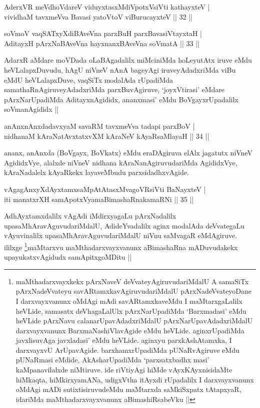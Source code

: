 \begin{shl}
AderxVR meVdhoVdareV viduyxtasxMdiVpotxV\s siVti kathayxteV | \\
vividhaM tavxmeVva Bavasi yatoV\s toV viBurucayxteV \hfill|| 32 || 
\end{shl}

\begin{shl}
soVmoV vaqSATxyXdiBAveVna parxBuH parxBavasiVtayxtaH | \\
AditayxH pArxNaBAveVna hayxnanxBAveVna soVmatA \hfill|| 33 || 
\end{shl}

\begin{artha}
AdarxR aMdare moVDada oLaBAgadalilx miMciniMda hoLeyutAtx iruve eMdu heVLalapxDuvudu, hAgU niVneV nAnA bageyAgi iruveyAdadxriMda viBu eMdU heVLalapxDuve, vaqSiTx modalAda rUpadiMda samathaRnAgiruveyAdadxriMda parxBuvAgiruve, `joyxVtirasi' eMdare pArxNarUpadiMda AditayxnAgididx, ananxmasi' eMdu BoVgayxrUpadalilx soVmanAgididx ||
\end{artha}

\begin{shl}
anAnxnAnxdadavxyaM savaRM tavxmeVva tadapi parxBoV | \\
nidhanaM kAraNatAvxtatxvXM kAraNeV kAyaRsaMlayaH \hfill|| 34 || 
\end{shl}

\begin{artha}
ananx, anAnxda (BoVgayx, BoVkatx) eMdu eraDAgiruva elAlx jagatutx niVneV AgididxVye, alalxde niVneV nidhana kAraNanAgiruvudariMda AgididxVye, kAraNadalelx kAyaRkekx layaveMbudu parxsidadhxvAgide.
\end{artha}

\begin{shl}
vAgagAnxyXdAyxtamxsaMpAtAtasxMvagoVR\s siVti BaNayxteV | \\
iti manatxrXH samApotxV\s yamaBimashaRnakamaRNi \hfill|| 35 || 
\end{shl}

\begin{artha}
  AdhAyxtamxdalilx vAgAdi iMdirxyagaLu pArxNadalilx upasaMhAravAguvudariMdalU, AdideYvadalilx aginx modalAda deVvategaLu vAyuvinalilx upasaMhAravAguvudariMdalU niVnu saMvagaR eMdAgiruve. ililxge \footnote{maMthadarxvayxkekx pArxNaveV deVvateyAgiruvudariMdalU A samaSiTx pArxNadeVvateyu savARtamxkavAgiruvudariMdalU pArxNadeVvateyoDane I darxvayxvanunx oMdAgi mAdi savARtamxkaveMdu I maMtarxgaLalilx heVLide, samasatx deVhagaLalUlx pArxNarUpadiMda `Barxmadasi' eMdu heVLide pArxNavu calanarUpavAdadxriMdalU pArxNarUpavAdadxriMdalU darxvayxvanunx BarxmaNashiVlavAgide eMdu heVLide. aginxrUpadiMda javxlisuvAga javxladasi' eMdu heVLide. aginxyu parxkAshAtamxka, I darxvayxvU ArUpavAgide. barxhamxrUpadiMda pUNaRvAgiruve eMdu pUNaRmasi eMdide, AkAsharUpadiMda `parxsatxbadhx masi' kaMpanavilalxde niMtiruve. ide riVtiyAgi hiMde vAyxKAyxnisidaMte hiMkaqta, hiMkirxyamANa, udigxVtha itAyxdi rUpadalilx I darxvayxvanunx oMdAgi mADi sutixtisiruvudeMdu maMtarxda saMkiSxpatx tAtapxyaR, idariMda maMthadarxvayxvanunx aBimashiRsabeVku ||}maMtarxvu maMthadarxvayxvanunx aBimashaRna mADuvudakekx upayukatxvAgidudx samApitxgoMDitu ||
\end{artha}

